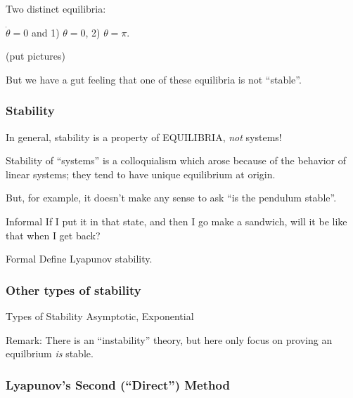 \documentclass[12pt]{beamer}
\begin{document}
\begin{frame}

Two distinct equilibria:

$\dot\theta = 0$ and 1) $\theta=0$, 2) $\theta=\pi$.

(put pictures)

But we have a gut feeling that one of these equilibria is not ``stable''.

\end{frame}



\begin{frame}
\frametitle{Stability}

In general, stability is a property of EQUILIBRIA, \emph{not} systems!

Stability of ``systems'' is a colloquialism which arose because of the behavior of linear systems;
they tend to have unique equilibrium at origin.

But, for example, it doesn't make any sense to ask ``is the pendulum stable''.

\end{frame}



\begin{frame}

\begin{block}{Informal}
If I put it in that state, and then I go make a sandwich, will it be like that when I get back?
\end{block}

\begin{block}{Formal}
Define Lyapunov stability.
\end{block}

\end{frame}



\begin{frame}
\frametitle{Other types of stability}

\begin{block}{Types of Stability}
Asymptotic,
Exponential
\end{block}

Remark: There is an ``instability'' theory, but here only focus on proving an equilbrium \emph{is} stable.


\end{frame}



\begin{frame}
\frametitle{Lyapunov's Second (``Direct'') Method}
\end{frame}
\end{document}
